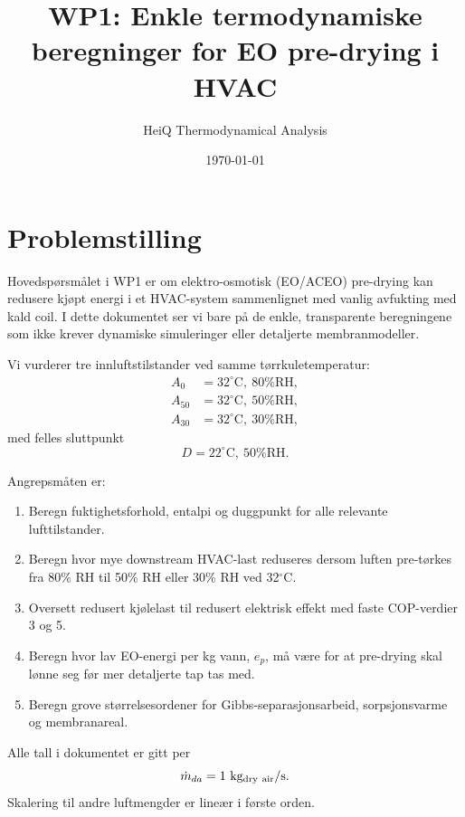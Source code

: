 \documentclass[11pt,a4paper]{article}
\title{WP1: Enkle termodynamiske beregninger for EO pre-drying i HVAC}
\author{HeiQ Thermodynamical Analysis}
\date{\today}
\begin{document}
\maketitle

\section{Problemstilling}

Hovedspørsmålet i WP1 er om elektro-osmotisk (EO/ACEO) pre-drying kan redusere kjøpt energi i et HVAC-system sammenlignet med vanlig avfukting med kald coil. I dette dokumentet ser vi bare på de enkle, transparente beregningene som ikke krever dynamiske simuleringer eller detaljerte membranmodeller.

Vi vurderer tre innluftstilstander ved samme tørrkuletemperatur:
\begin{align*}
    A_0 &= 32^\circ\mathrm{C},\ 80\%\mathrm{RH}, \\
    A_{50} &= 32^\circ\mathrm{C},\ 50\%\mathrm{RH}, \\
    A_{30} &= 32^\circ\mathrm{C},\ 30\%\mathrm{RH},
\end{align*}
med felles sluttpunkt
\begin{equation*}
    D = 22^\circ\mathrm{C},\ 50\%\mathrm{RH}.
\end{equation*}

Angrepsmåten er:
\begin{enumerate}
    \item Beregn fuktighetsforhold, entalpi og duggpunkt for alle relevante lufttilstander.
    \item Beregn hvor mye downstream HVAC-last reduseres dersom luften pre-tørkes fra 80\% RH til 50\% RH eller 30\% RH ved 32$^\circ$C.
    \item Oversett redusert kjølelast til redusert elektrisk effekt med faste COP-verdier 3 og 5.
    \item Beregn hvor lav EO-energi per kg vann, $e_p$, må være for at pre-drying skal lønne seg før mer detaljerte tap tas med.
    \item Beregn grove størrelsesordener for Gibbs-separasjonsarbeid, sorpsjonsvarme og membranareal.
\end{enumerate}

Alle tall i dokumentet er gitt per
\begin{equation*}
    \dot m_{da} = 1\ \mathrm{kg_{dry\ air}/s}.
\end{equation*}
Skalering til andre luftmengder er lineær i første orden.
\end{document}
